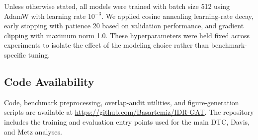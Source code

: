 Unless otherwise stated, all models were trained with batch size 512 using AdamW \cite{loshchilov2019adamw} with learning rate $10^{-3}$. We applied cosine annealing learning-rate decay, early stopping with patience 20 based on validation performance, and gradient clipping with maximum norm 1.0. These hyperparameters were held fixed across experiments to isolate the effect of the modeling choice rather than benchmark-specific tuning.

\subsection{Code Availability}

Code, benchmark preprocessing, overlap-audit utilities, and figure-generation scripts are available at \url{https://github.com/Basartemiz/IDR-GAT}. The repository includes the training and evaluation entry points used for the main DTC, Davis, and Metz analyses.

